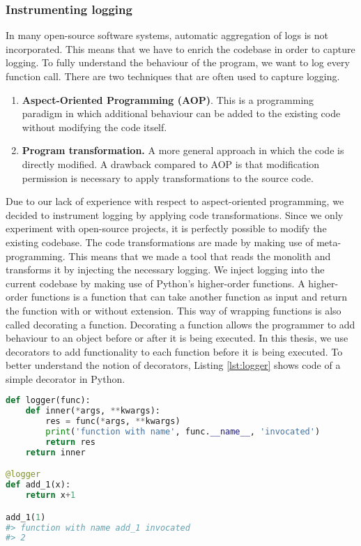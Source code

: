\subsubsection{Instrumenting logging}
In many open-source software systems, automatic aggregation of logs is not incorporated. This means that we have to enrich the codebase in order to capture logging. To fully understand the behaviour of the program, we want to log every function call. There are two techniques that are often used to capture logging.

\begin{enumerate}
    \item \textbf{Aspect-Oriented Programming (AOP)}. This is a programming paradigm in which additional behaviour can be added to the existing code without modifying the code itself. 
    \item \textbf{Program transformation.} A more general approach in which the code is directly modified. A drawback compared to AOP is that modification permission is necessary to apply transformations to the source code.
\end{enumerate}

Due to our lack of experience with respect to aspect-oriented programming, we decided to instrument logging by applying code transformations. Since we only experiment with open-source projects, it is perfectly possible to modify the existing codebase. The code transformations are made by making use of meta-programming. This means that we made a tool that reads the monolith and transforms it by injecting the necessary logging. We inject logging into the current codebase by making use of Python's higher-order functions. A higher-order functions is a function that can take another function as input and return the function with or without extension. This way of wrapping functions is also called decorating a function. Decorating a function allows the programmer to add behaviour to an object before or after it is being executed. In this thesis, we use decorators to add functionality to each function before it is being executed. To better understand the notion of decorators, Listing \ref{lst:logger} shows code of a simple decorator in Python. \par

\begin{lstlisting}[language=Python, caption=Logger, label={lst:logger}]
def logger(func):
	def inner(*args, **kwargs):
		res = func(*args, **kwargs)
		print('function with name', func.__name__, 'invocated')
		return res
	return inner

@logger
def add_1(x):
    return x+1

add_1(1)
#> function with name add_1 invocated
#> 2
\end{lstlisting}

